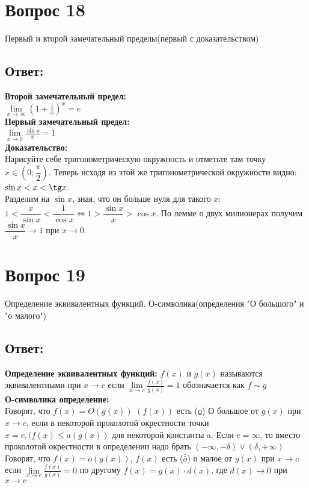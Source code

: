 \documentclass{article}
\begin{document}
\section*{Вопрос 18}
\begin{center}
  Первый и второй замечательный пределы(первый с доказательством)
\end{center}
\subsection*{Ответ:}
\textbf{Второй замечательный предел:}\\
$\lim\limits_{x \to \infty} (1 + \frac{1}{x})^x = e$\\
\textbf{Первый замечательный предел:}\\
$\lim\limits_{x \to 0} \frac{\sin x}{x} = 1$\\
\textbf{Доказательство:}\\
Нарисуйте себе тригонометрическую окружность и отметьте там точку $x \in \left(0; \dfrac{\pi}{2}\right)$. Теперь исходя из этой же тригонометрической окружности видно: $\sin x < x < \tg x$. \\
Разделим на $\sin x$, зная, что он больше нуля для такого $x$: \\
$1 < \dfrac{x}{\sin x} < \dfrac{1}{\cos x} \Leftrightarrow 1 > \dfrac{\sin x}{x} > \cos x$. По лемме о двух милионерах получим $\dfrac{\sin x}{x} \to 1$ при $x \to 0$.
 
\section*{Вопрос 19}
\begin{center}
  Определение эквивалентных функций. О-символика(определения "О большого" и
  "о малого")
\end{center}
\subsection*{Ответ:}
\textbf{Определение эквивалентных функций:} $f(x)$ и $g(x)$ называются эквивалентными при $x \to c$ если $\lim\limits_{x \to c} \frac{f(x)}{g(x)} = 1$ обозначается как $f \sim g$\\
\textbf{О-символика определение:}\\
Говорят, что $f(x) = O(g(x))$ $(f(x))$ есть (\underline{\underline{o}}) О большое от $g(x)$
при $x \to c$, если в некоторой проколотой окрестности точки $x = c, (f(x) \leq a(g(x))$
для некоторой константы a. Если $c = \infty$, то вместо проколотой окрестности в определении
надо брать $(-\infty,-\delta) \vee (\delta, +\infty)$ \\
Говорят, что $f(x) = o(g(x))$,\; $f(x)$ есть ($\bar{\bar{o}}$)\; о малое от $g(x)$ при $x \to c$ если $\lim\limits_{x \to c} \frac{f(x)}{g(x)} = 0$ по другому
$f(x) = g(x) \cdot d(x)$, где $d(x) \to 0$ при $x \to c$
\end{document}
